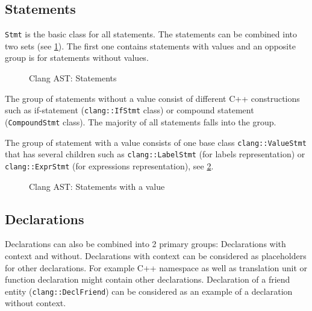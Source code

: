 \subsection{Statements}
\texttt{Stmt} is the basic class for all statements. The statements can
be combined into two sets (see \cref{fig:ast_stmt}). The first one contains
statements with values and an opposite group is for statements without values.
\begin{figure}[H]
  \caption{Clang AST: Statements}  
  \label{fig:ast_stmt}
\end{figure}

The group of statements without a value consist of different C++ constructions
such as if-statement (\texttt{clang::IfStmt} class) or compound statement
(\texttt{CompoundStmt} class). The majority of all statements falls
into the group.

The group of statement with a value consists of one base class
\texttt{clang::ValueStmt} that has several children such as
\texttt{clang::LabelStmt} (for labels representation) or
\texttt{clang::ExprStmt} (for expressions representation), see
\cref{fig:ast_valuestmt}.

\begin{figure}
  \caption{Clang AST: Statements with a value}  
  \label{fig:ast_valuestmt}
\end{figure}

\subsection{Declarations}
Declarations can also be combined into 2 primary groups: Declarations with
context and without. Declarations with context can be considered as placeholders
for other declarations. For example C++ namespace as well as translation unit or
function declaration might contain other declarations. Declaration of a friend
entity (\texttt{clang::DeclFriend}) can 
be considered as an example of a declaration without context.


